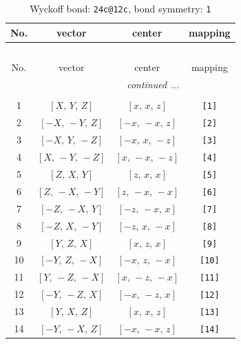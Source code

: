 \documentclass[fleqn,8pt]{jsarticle}
\begin{document}
\begin{longtable}{cccc}
\caption{Wyckoff bond: {\tt 24c@12c}, bond symmetry: {\tt 1}}
 \\
 \hline \hline
No. & vector & center & mapping \\ \hline \endfirsthead

\multicolumn{3}{l}{\tablename\ \thetable{}} \\
 \hline \hline
No. & vector & center & mapping \\ \hline \endhead

 \hline \hline
\multicolumn{3}{r}{\footnotesize\it continued ...} \\ \endfoot

 \hline \hline
\multicolumn{3}{r}{} \\ \endlastfoot

1 & $\left[ X,\, Y,\, Z \right]$ & $\left[ x,\, x,\, z \right]$ & {\tt [1]} \\ \hline
2 & $\left[ - X,\, - Y,\, Z \right]$ & $\left[ - x,\, - x,\, z \right]$ & {\tt [2]} \\ \hline
3 & $\left[ - X,\, Y,\, - Z \right]$ & $\left[ - x,\, x,\, - z \right]$ & {\tt [3]} \\ \hline
4 & $\left[ X,\, - Y,\, - Z \right]$ & $\left[ x,\, - x,\, - z \right]$ & {\tt [4]} \\ \hline
5 & $\left[ Z,\, X,\, Y \right]$ & $\left[ z,\, x,\, x \right]$ & {\tt [5]} \\ \hline
6 & $\left[ Z,\, - X,\, - Y \right]$ & $\left[ z,\, - x,\, - x \right]$ & {\tt [6]} \\ \hline
7 & $\left[ - Z,\, - X,\, Y \right]$ & $\left[ - z,\, - x,\, x \right]$ & {\tt [7]} \\ \hline
8 & $\left[ - Z,\, X,\, - Y \right]$ & $\left[ - z,\, x,\, - x \right]$ & {\tt [8]} \\ \hline
9 & $\left[ Y,\, Z,\, X \right]$ & $\left[ x,\, z,\, x \right]$ & {\tt [9]} \\ \hline
10 & $\left[ - Y,\, Z,\, - X \right]$ & $\left[ - x,\, z,\, - x \right]$ & {\tt [10]} \\ \hline
11 & $\left[ Y,\, - Z,\, - X \right]$ & $\left[ x,\, - z,\, - x \right]$ & {\tt [11]} \\ \hline
12 & $\left[ - Y,\, - Z,\, X \right]$ & $\left[ - x,\, - z,\, x \right]$ & {\tt [12]} \\ \hline
13 & $\left[ Y,\, X,\, Z \right]$ & $\left[ x,\, x,\, z \right]$ & {\tt [13]} \\ \hline
14 & $\left[ - Y,\, - X,\, Z \right]$ & $\left[ - x,\, - x,\, z \right]$ & {\tt [14]} \\ \hline

\end{longtable}
\end{document}
